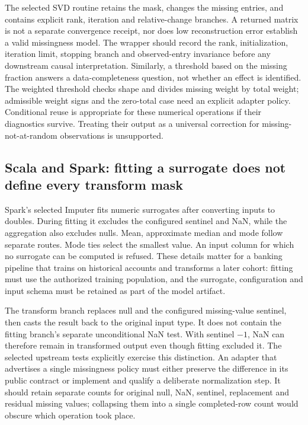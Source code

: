 The selected SVD routine retains the mask, changes the missing entries, and contains explicit rank, iteration and relative-change branches. A returned matrix is not a separate convergence receipt, nor does low reconstruction error establish a valid missingness model. The wrapper should record the rank, initialization, iteration limit, stopping branch and observed-entry invariance before any downstream causal interpretation. Similarly, a threshold based on the missing fraction answers a data-completeness question, not whether an effect is identified. The weighted threshold checks shape and divides missing weight by total weight; admissible weight signs and the zero-total case need an explicit adapter policy. Conditional reuse is appropriate for these numerical operations if their diagnostics survive. Treating their output as a universal correction for missing-not-at-random observations is unsupported.~\citep{exec25_otm_imputejl,exec25_otm_choice}

\subsection{Scala and Spark: fitting a surrogate does not define every transform mask}

Spark's selected Imputer fits numeric surrogates after converting inputs to doubles. During fitting it excludes the configured sentinel and NaN, while the aggregation also excludes nulls. Mean, approximate median and mode follow separate routes. Mode ties select the smallest value. An input column for which no surrogate can be computed is refused. These details matter for a banking pipeline that trains on historical accounts and transforms a later cohort: fitting must use the authorized training population, and the surrogate, configuration and input schema must be retained as part of the model artifact.~\citep{exec25_otm_spark}

The transform branch replaces null and the configured missing-value sentinel, then casts the result back to the original input type. It does not contain the fitting branch's separate unconditional NaN test. With sentinel $-1$, NaN can therefore remain in transformed output even though fitting excluded it. The selected upstream tests explicitly exercise this distinction. An adapter that advertises a single missingness policy must either preserve the difference in its public contract or implement and qualify a deliberate normalization step. It should retain separate counts for original null, NaN, sentinel, replacement and residual missing values; collapsing them into a single completed-row count would obscure which operation took place.~\citep{exec25_otm_spark,exec25_otm_choice}

